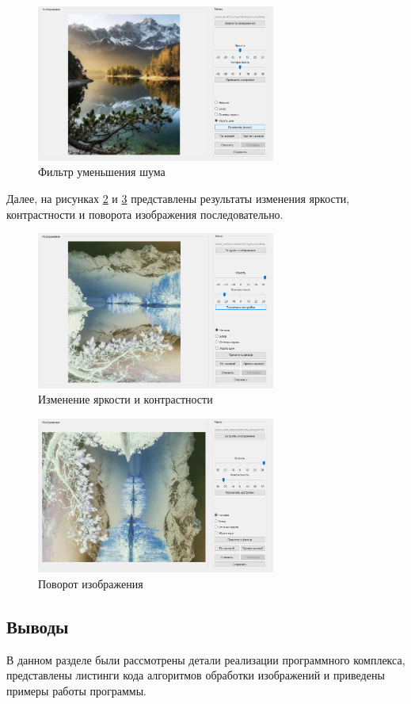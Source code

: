 \begin{figure}[hbtp]
	\centering
	\includegraphics[width=0.7\textwidth]{img/res7.png}
	\caption{\label{fig:spire35} Фильтр уменьшения шума}
\end{figure}

Далее, на рисунках \ref{fig:spire36} и \ref{fig:spire37} представлены результаты изменения яркости, контрастности и поворота изображения последовательно.

\begin{figure}[hbtp]
	\centering
	\includegraphics[width=0.7\textwidth]{img/res3.png}
	\caption{\label{fig:spire36} Изменение яркости и контрастности}
\end{figure}

\begin{figure}[hbtp]
	\centering
	\includegraphics[width=0.7\textwidth]{img/res4.png}
	\caption{\label{fig:spire37} Поворот изображения}
\end{figure}

\clearpage

\subsection*{Выводы}

В данном разделе были рассмотрены детали реализации программного комплекса, представлены листинги кода алгоритмов обработки изображений и приведены примеры работы программы.

\pagebreak